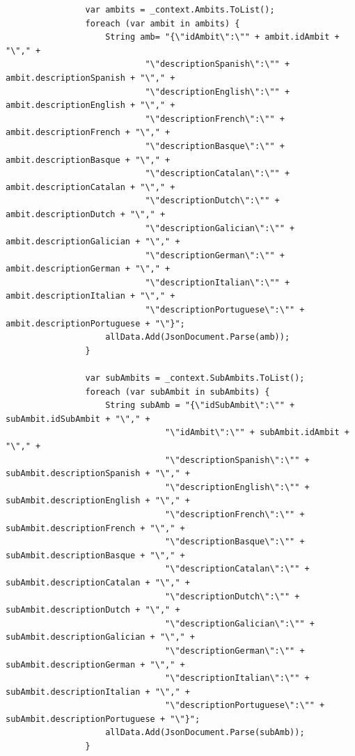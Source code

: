 \begin{itemize}
\begin{itemize}
\begin{lstlisting}
                var ambits = _context.Ambits.ToList();
                foreach (var ambit in ambits) {
                    String amb= "{\"idAmbit\":\"" + ambit.idAmbit + "\"," +
                            "\"descriptionSpanish\":\"" + ambit.descriptionSpanish + "\"," +
                            "\"descriptionEnglish\":\"" + ambit.descriptionEnglish + "\"," +
                            "\"descriptionFrench\":\"" + ambit.descriptionFrench + "\"," +
                            "\"descriptionBasque\":\"" + ambit.descriptionBasque + "\"," +
                            "\"descriptionCatalan\":\"" + ambit.descriptionCatalan + "\"," +
                            "\"descriptionDutch\":\"" + ambit.descriptionDutch + "\"," +
                            "\"descriptionGalician\":\"" + ambit.descriptionGalician + "\"," +
                            "\"descriptionGerman\":\"" + ambit.descriptionGerman + "\"," +
                            "\"descriptionItalian\":\"" + ambit.descriptionItalian + "\"," +
                            "\"descriptionPortuguese\":\"" + ambit.descriptionPortuguese + "\"}";
                    allData.Add(JsonDocument.Parse(amb));
                }

                var subAmbits = _context.SubAmbits.ToList();
                foreach (var subAmbit in subAmbits) {
                    String subAmb = "{\"idSubAmbit\":\"" + subAmbit.idSubAmbit + "\"," +
                                "\"idAmbit\":\"" + subAmbit.idAmbit + "\"," +
                                "\"descriptionSpanish\":\"" + subAmbit.descriptionSpanish + "\"," +
                                "\"descriptionEnglish\":\"" + subAmbit.descriptionEnglish + "\"," +
                                "\"descriptionFrench\":\"" + subAmbit.descriptionFrench + "\"," +
                                "\"descriptionBasque\":\"" + subAmbit.descriptionBasque + "\"," +
                                "\"descriptionCatalan\":\"" + subAmbit.descriptionCatalan + "\"," +
                                "\"descriptionDutch\":\"" + subAmbit.descriptionDutch + "\"," +
                                "\"descriptionGalician\":\"" + subAmbit.descriptionGalician + "\"," +
                                "\"descriptionGerman\":\"" + subAmbit.descriptionGerman + "\"," +
                                "\"descriptionItalian\":\"" + subAmbit.descriptionItalian + "\"," +
                                "\"descriptionPortuguese\":\"" + subAmbit.descriptionPortuguese + "\"}";
                    allData.Add(JsonDocument.Parse(subAmb));
                }


\end{lstlisting}
\end{itemize}
\end{itemize}
